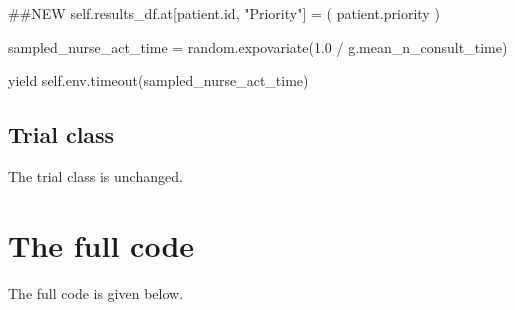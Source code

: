 \documentclass[
  letterpaper,
  DIV=11,
  numbers=noendperiod]{scrreprt}
\newenvironment{Shaded}{\begin{snugshade}}{\end{snugshade}}
\newcommand{\BuiltInTok}[1]{\textcolor[rgb]{0.00,0.23,0.31}{#1}}
\newcommand{\CommentTok}[1]{\textcolor[rgb]{0.37,0.37,0.37}{#1}}
\newcommand{\ControlFlowTok}[1]{\textcolor[rgb]{0.00,0.23,0.31}{#1}}
\newcommand{\FloatTok}[1]{\textcolor[rgb]{0.68,0.00,0.00}{#1}}
\newcommand{\NormalTok}[1]{\textcolor[rgb]{0.00,0.23,0.31}{#1}}
\newcommand{\OperatorTok}[1]{\textcolor[rgb]{0.37,0.37,0.37}{#1}}
\newcommand{\StringTok}[1]{\textcolor[rgb]{0.13,0.47,0.30}{#1}}
\newcommand{\VariableTok}[1]{\textcolor[rgb]{0.07,0.07,0.07}{#1}}
\begin{document}
\begin{Shaded}
\begin{Highlighting}[]
                \CommentTok{\#\#NEW}
                \VariableTok{self}\NormalTok{.results\_df.at[patient.}\BuiltInTok{id}\NormalTok{, }\StringTok{"Priority"}\NormalTok{] }\OperatorTok{=}\NormalTok{ (}
\NormalTok{                    patient.priority}
\NormalTok{                )}

\NormalTok{            sampled\_nurse\_act\_time }\OperatorTok{=}\NormalTok{ random.expovariate(}\FloatTok{1.0} \OperatorTok{/}
\NormalTok{                                                        g.mean\_n\_consult\_time)}

            \ControlFlowTok{yield} \VariableTok{self}\NormalTok{.env.timeout(sampled\_nurse\_act\_time)}
\end{Highlighting}
\end{Shaded}

\subsection{Trial class}\label{trial-class-2}

The trial class is unchanged.

\section{The full code}\label{the-full-code}

The full code is given below.
\end{document}
